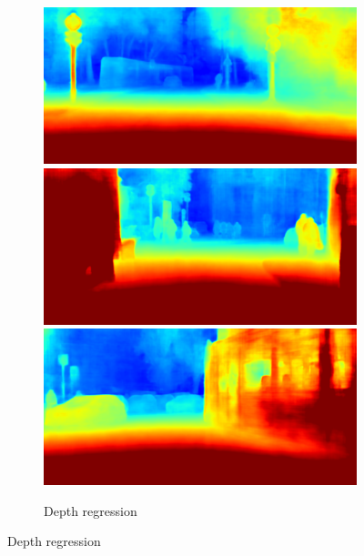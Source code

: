 {\begin{figure}[t]
{{\begin{subfigure}[t]{0.24\linewidth}
\begin{center}
		\includegraphics[width=\linewidth,trim={0px 60px 0 0px},clip]{failure/munich_000252_000019_depth_prediction.png}
		\includegraphics[width=\linewidth,trim={0px 60px 0 0px},clip]{failure/munich_000158_000019_depth_prediction.png}
		\includegraphics[width=\linewidth,trim={0px 60px 0 0px},clip]{failure/munich_000348_000019_depth_prediction.png}
  \caption{Depth regression}
\end{center}
\end{subfigure}}}

\end{figure}}
